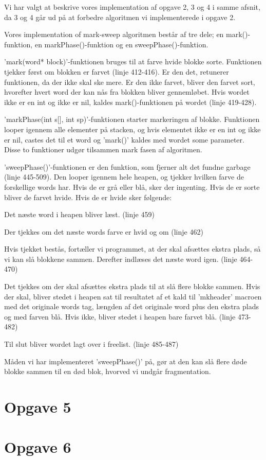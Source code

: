 Vi har valgt at beskrive vores implementation af opgave 2, 3 og 4 i samme afsnit, da 3 og 4 går ud på at forbedre algoritmen vi implementerede i opgave 2.

Vores implementation of mark-sweep algoritmen består af tre dele; en mark()-funktion, en markPhase()-funktion og en sweepPhase()-funktion. 

'mark(word* block)'-funktionen bruges til at farve hvide blokke sorte. Funktionen tjekker først om blokken er farvet (linje 412-416). Er den det, retunerer funktionen, da der ikke skal ske mere. Er den ikke farvet, bliver den farvet sort, hvorefter hvert word der kan nås fra blokken bliver gennemløbet. Hvis wordet ikke er en int og ikke er nil, kaldes mark()-funktionen på wordet (linje 419-428).

'markPhase(int s[], int sp)'-funktionen starter markeringen af blokke. Funktionen looper igennem alle elementer på stacken, og hvis elementet ikke er en int og ikke er nil, castes det til et word og 'mark()' kaldes med wordet some parameter. Disse to funktioner udgør tilsammen mark fasen af algoritmen.

'sweepPhase()'-funktionen er den funktion, som fjerner alt det fundne garbage (linje 445-509). Den looper igennem hele heapen, og tjekker hvilken farve de forskellige words har. Hvis de er grå eller blå, sker der ingenting. Hvis de er sorte bliver de farvet hvide. Hvis de er hvide sker følgende:
\begin{my_enumerate}
	\item Det næste word i heapen bliver læst. (linje 459)
	\item Der tjekkes om det næste words farve er hvid og om (linje 462) %
	\item Hvis tjekket bestås, fortæller vi programmet, at der skal afsættes ekstra plads, så vi kan slå blokkene sammen. Derefter indlæses det næste word igen. (linje 464-470)
	\item Det tjekkes om der skal afsættes ekstra plads til at slå flere blokke sammen. Hvis der skal, bliver stedet i heapen sat til resultatet af et kald til 'mkheader' macroen med det originale words tag, længden af det originale word plus den ekstra plads og med farven blå. Hvis ikke, bliver stedet i heapen bare farvet blå. (linje 473-482)
	\item Til slut bliver wordet lagt over i freelist. (linje 485-487)
\end{my_enumerate}

Måden vi har implementeret 'sweepPhase()' på, gør at den kan slå flere døde blokke sammen til en død blok, hvorved vi undgår fragmentation.

\section{Opgave 5}
\label{O5}

\section{Opgave 6}
\label{O6}
